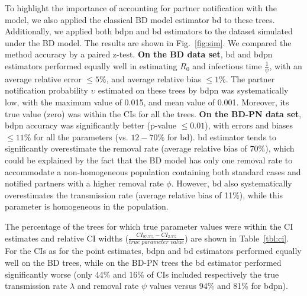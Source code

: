 \documentclass[10pt,letterpaper]{article}
\begin{document}
To highlight the importance of accounting for partner notification with the model, we also applied the classical BD model estimator bd to these trees. Additionally, we applied both bdpn and bd estimators to the dataset simulated under the BD model. The results are shown in  Fig.~\ref{fig:sim}.
We compared the method accuracy by a paired z-test. \textbf{On the BD data set}, bd and bdpn estimators performed equally well in estimating $R_0$ and infectious time $\frac{1}{\psi}$, with an average relative error $\leq 5\%$, and average relative bias $\leq 1\%$. The partner notification probability $\upsilon$ estimated on these trees by bdpn was systematically low, with the maximum value of 0.015, and mean value of 0.001. Moreover, its true value (zero) was within the CIs for all the trees. \textbf{On the BD-PN data set}, bdpn accuracy was significantly better (p-value $\leq 0.01$), with errors and biases $\leq 11\%$ for all the parameters (vs. $12-70\%$ for bd). bd estimator tends to significantly overestimate the removal rate (average relative bias of 70\%), which could be explained by the fact that the BD model has only one removal rate to accommodate a non-homogeneous population containing both standard cases and notified partners with a higher removal rate $\phi$.  However, bd also systematically overestimates the transmission rate (average relative bias of 11\%), while this parameter is homogeneous in the population.






The percentage of the trees for which true parameter values were within the CI estimates and relative CI widths ($\frac{CI_{97.5\%} - CI_{2.5\%}}{\textit{true parameter value}}$) are shown in Table~\ref{tbl:ci}. For the CIs as for the point estimates, bdpn and bd estimators performed equally well on the BD trees, while on the BD-PN trees the bd estimator performed significantly worse (only 44\% and 16\% of CIs included respectively the true transmission rate $\lambda$ and removal rate $\psi$ values versus 94\% and 81\% for bdpn). 
\end{document}
